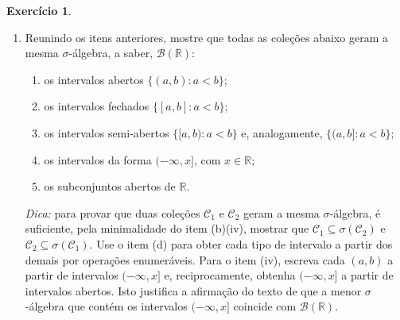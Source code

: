 \documentclass[12pt,portuguese]{article}
\theoremstyle{definition}
\theoremstyle{plainexercise}
\newtheorem{exercise}{Exercício}
\theoremstyle{starredexercise}
\theoremstyle{definition}
\begin{document}
\begin{exercise}
\begin{enumerate}[label=\textbf{(\alph*)}, leftmargin=*, itemsep=0.6em]
    \item Reunindo os itens anteriores,
    mostre que todas as coleções abaixo geram a mesma $\sigma$-álgebra, a
    saber, $\mathscr{B}(\mathbb{R})$:
    \begin{enumerate}[label=(\roman*)]
      \item os intervalos abertos $\{(a,b) : a < b\}$;
      \item os intervalos fechados $\{[a,b] : a < b\}$;
      \item os intervalos semi-abertos $\{[a,b) : a < b\}$ e, analogamente,
        $\{(a,b] : a < b\}$;
      \item os intervalos da forma $(-\infty, x]$, com $x \in \mathbb{R}$;
      \item os subconjuntos abertos de $\mathbb{R}$.
    \end{enumerate}
    \emph{Dica:} para provar que duas coleções $\mathcal{C}_1$ e
    $\mathcal{C}_2$ geram a mesma $\sigma$-álgebra, é suficiente, pela
    minimalidade do item (b)(iv), mostrar que
    $\mathcal{C}_1 \subseteq \sigma(\mathcal{C}_2)$ e
    $\mathcal{C}_2 \subseteq \sigma(\mathcal{C}_1)$. Use o item (d) para
    obter cada tipo de intervalo a partir dos demais por operações
    enumeráveis. Para o item (iv), escreva cada $(a,b)$ a partir de
    intervalos $(-\infty, x]$ e, reciprocamente, obtenha $(-\infty, x]$ a
    partir de intervalos abertos. Isto justifica a afirmação do texto de que
    a menor $\sigma$-álgebra que contém os intervalos $(-\infty, x]$
    coincide com $\mathscr{B}(\mathbb{R})$.
  \end{enumerate}
\end{exercise}



\end{document}
